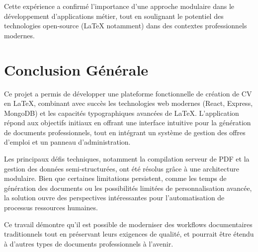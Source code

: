 \documentclass{report}
\begin{document}
\vspace*{-0.3cm} %
Cette expérience a confirmé l'importance d'une approche modulaire dans le développement d'applications métier, tout en soulignant le potentiel des technologies open-source (LaTeX notamment) dans des contextes professionnels modernes.

\section{Conclusion Générale}
\clearpage


\vspace*{\fill} %

Ce projet a permis de développer une plateforme fonctionnelle de création de CV en LaTeX, combinant avec succès les technologies web modernes (React, Express, MongoDB) et les capacités typographiques avancées de LaTeX. L'application répond aux objectifs initiaux en offrant une interface intuitive pour la génération de documents professionnels, tout en intégrant un système de gestion des offres d'emploi et un panneau d'administration.

\vspace{1cm} %

Les principaux défis techniques, notamment la compilation serveur de PDF et la gestion des données semi-structurées, ont été résolus grâce à une architecture modulaire. Bien que certaines limitations persistent, comme les temps de génération des documents ou les possibilités limitées de personnalisation avancée, la solution ouvre des perspectives intéressantes pour l'automatisation de processus ressources humaines.

\vspace{1cm} %

Ce travail démontre qu'il est possible de moderniser des workflows documentaires traditionnels tout en préservant leurs exigences de qualité, et pourrait être étendu à d'autres types de documents professionnels à l'avenir.

\vspace*{\fill} %
\end{document}
